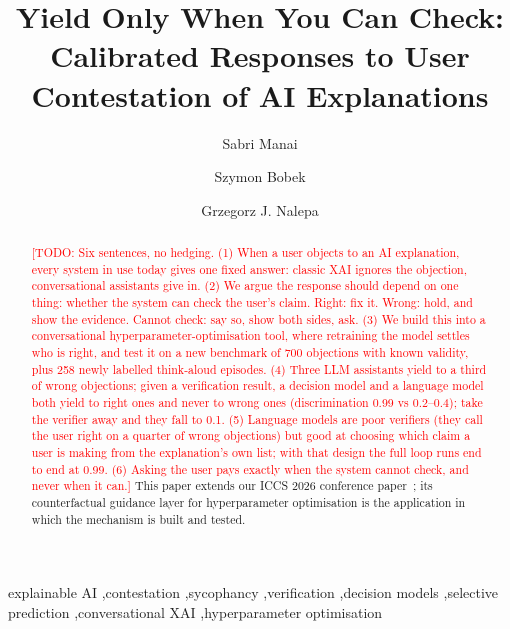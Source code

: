 \documentclass[preprint,12pt,3p,times]{elsarticle}
\newcommand{\todo}[1]{\textcolor{red}{[TODO: #1]}}
\begin{document}
\begin{frontmatter}

\title{Yield Only When You Can Check: Calibrated Responses to User Contestation of AI Explanations}

\author[uj]{Sabri Manai}
\author[uj]{Szymon Bobek}
\author[uj]{Grzegorz J. Nalepa}
\address[uj]{Jagiellonian University, Krak{\'o}w, Poland}

\begin{abstract}
\todo{Six sentences, no hedging. (1) When a user objects to an AI explanation, every system in use today gives one fixed answer: classic XAI ignores the objection, conversational assistants give in. (2) We argue the response should depend on one thing: whether the system can check the user's claim. Right: fix it. Wrong: hold, and show the evidence. Cannot check: say so, show both sides, ask. (3) We build this into a conversational hyperparameter-optimisation tool, where retraining the model settles who is right, and test it on a new benchmark of 700 objections with known validity, plus 258 newly labelled think-aloud episodes. (4) Three LLM assistants yield to a third of wrong objections; given a verification result, a decision model and a language model both yield to right ones and never to wrong ones (discrimination 0.99 vs 0.2--0.4); take the verifier away and they fall to 0.1. (5) Language models are poor verifiers (they call the user right on a quarter of wrong objections) but good at choosing which claim a user is making from the explanation's own list; with that design the full loop runs end to end at 0.99. (6) Asking the user pays exactly when the system cannot check, and never when it can.}
This paper extends our ICCS 2026 conference paper~\cite{manai2026orders}; its counterfactual guidance layer for hyperparameter optimisation is the application in which the mechanism is built and tested.
\end{abstract}

\begin{keyword}
explainable AI \sep contestation \sep sycophancy \sep verification \sep decision models \sep selective prediction \sep conversational XAI \sep hyperparameter optimisation
\end{keyword}

\end{frontmatter}
\end{document}
